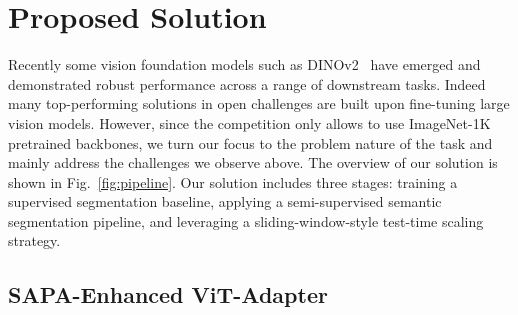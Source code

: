 \section{Proposed Solution}
\label{sec:method}

Recently some vision foundation models such as DINOv2~\cite{oquab2023dinov2} have emerged and demonstrated robust performance across a range of downstream tasks. Indeed many top-performing solutions in open challenges are built upon fine-tuning large vision models. However, since the competition only allows to use ImageNet-1K pretrained backbones, we turn our focus to the problem nature of the task and mainly address the challenges we observe above.
The overview of our solution is %
shown in Fig.~\ref{fig:pipeline}. Our solution includes three stages: training a supervised segmentation baseline, applying a semi-supervised semantic segmentation pipeline, and leveraging a sliding-window-style test-time scaling strategy. %



\subsection{SAPA-Enhanced ViT-Adapter}

